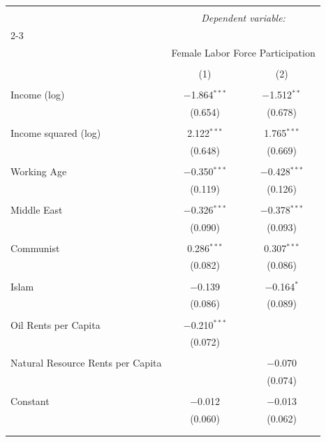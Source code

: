 \documentclass[12pt,letterpaper]{article}
\begin{document}
\begin{table}[!htbp] \centering 
	\label{} 
	\begin{tabular}{@{\extracolsep{5pt}}lcc} 
		\\[-1.8ex]\hline 
		\hline \\[-1.8ex] 
		& \multicolumn{2}{c}{\textit{Dependent variable:}} \\ 
		\cline{2-3} 
		\\[-1.8ex] & \multicolumn{2}{c}{Female Labor Force Participation} \\ 
		\\[-1.8ex] & (1) & (2)\\ 
		\hline \\[-1.8ex] 
		Income (log) & $-$1.864$^{***}$ & $-$1.512$^{**}$ \\ 
		& (0.654) & (0.678) \\ 
		& & \\ 
		Income squared (log) & 2.122$^{***}$ & 1.765$^{***}$ \\ 
		& (0.648) & (0.669) \\ 
		& & \\ 
		Working Age & $-$0.350$^{***}$ & $-$0.428$^{***}$ \\ 
		& (0.119) & (0.126) \\ 
		& & \\ 
		Middle East & $-$0.326$^{***}$ & $-$0.378$^{***}$ \\ 
		& (0.090) & (0.093) \\ 
		& & \\ 
		Communist & 0.286$^{***}$ & 0.307$^{***}$ \\ 
		& (0.082) & (0.086) \\ 
		& & \\ 
		Islam & $-$0.139 & $-$0.164$^{*}$ \\ 
		& (0.086) & (0.089) \\ 
		& & \\ 
		Oil Rents per Capita & $-$0.210$^{***}$ &  \\ 
		& (0.072) &  \\ 
		& & \\ 
		Natural Resource Rents per Capita &  & $-$0.070 \\ 
		&  & (0.074) \\ 
		& & \\ 
		Constant & $-$0.012 & $-$0.013 \\ 
		& (0.060) & (0.062) \\ 
		& & \\ 
		\hline \\[-1.8ex] 

\end{tabular}
\end{table}
\end{document}
